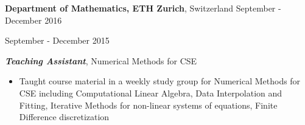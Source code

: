 \vspace{7pt}

\textbf{Department of Mathematics, ETH Zurich}, Switzerland \hfill September - December 2016

\hfill September - December 2015


\textbf{\textit{Teaching Assistant}}, Numerical Methods for CSE

\begin{itemize}
    \item Taught course material in a weekly study group for Numerical Methods for CSE including Computational Linear Algebra, Data Interpolation and Fitting, Iterative Methods for non-linear systems of equations, Finite Difference discretization
\end{itemize}
